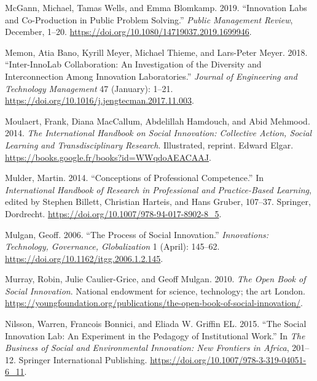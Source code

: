 \documentclass[AMA,STIX1COL,APA,STIX2COL]{WileyNJD-v2}
\newlength{\cslhangindent}
\newenvironment{CSLReferences}[2] %
 {%
  \setlength{\parindent}{0pt}
  \ifodd #1 \everypar{\setlength{\hangindent}{\cslhangindent}}\ignorespaces\fi
  \ifnum #2 > 0
  \setlength{\parskip}{#2\baselineskip}
  \fi
 }%
 {}
\begin{document}
\begin{CSLReferences}{1}{0}
\leavevmode{}%
McGann, Michael, Tamas Wells, and Emma Blomkamp. 2019. {``Innovation
Labs and Co-Production in Public Problem Solving.''} \emph{Public
Management Review}, December, 1--20.
\url{https://doi.org/10.1080/14719037.2019.1699946}.

\leavevmode{}%
Memon, Atia Bano, Kyrill Meyer, Michael Thieme, and Lars-Peter Meyer.
2018. {``Inter-InnoLab Collaboration: An Investigation of the Diversity
and Interconnection Among Innovation Laboratories.''} \emph{Journal of
Engineering and Technology Management} 47 (January): 1--21.
\url{https://doi.org/10.1016/j.jengtecman.2017.11.003}.

\leavevmode{}%
Moulaert, Frank, Diana MacCallum, Abdelillah Hamdouch, and Abid Mehmood.
2014. \emph{The International Handbook on Social Innovation: Collective
Action, Social Learning and Transdisciplinary Research}. Illustrated,
reprint. Edward Elgar.
\url{https://books.google.fr/books?id=WWqdoAEACAAJ}.

\leavevmode{}%
Mulder, Martin. 2014. {``Conceptions of Professional Competence.''} In
\emph{International Handbook of Research in Professional and
Practice-Based Learning}, edited by Stephen Billett, Christian Harteis,
and Hans Gruber, 107--37. Springer, Dordrecht.
\url{https://doi.org/10.1007/978-94-017-8902-8_5}.

\leavevmode{}%
Mulgan, Geoff. 2006. {``The Process of Social Innovation.''}
\emph{Innovations: Technology, Governance, Globalization} 1 (April):
145--62. \url{https://doi.org/10.1162/itgg.2006.1.2.145}.

\leavevmode{}%
Murray, Robin, Julie Caulier-Grice, and Geoff Mulgan. 2010. \emph{The
Open Book of Social Innovation}. National endowment for science,
technology; the art London.
\url{https://youngfoundation.org/publications/the-open-book-of-social-innovation/}.

\leavevmode{}%
Nilsson, Warren, Francois Bonnici, and Eliada W. Griffin EL. 2015.
{``The Social Innovation Lab: An Experiment in the Pedagogy of
Institutional Work.''} In \emph{The Business of Social and Environmental
Innovation: New Frontiers in Africa}, 201--12. Springer International
Publishing. \url{https://doi.org/10.1007/978-3-319-04051-6_11}.


\end{CSLReferences}
\end{document}
